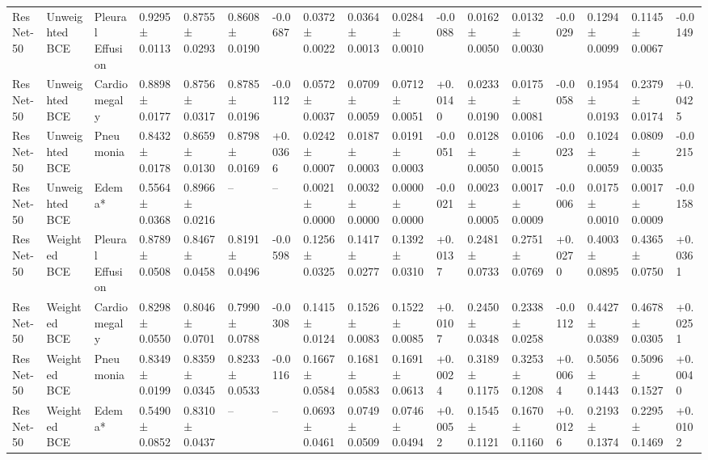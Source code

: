 \begin{tabular}{lllllllllllllllll}
ResNet-50 & Unweighted BCE & Pleural Effusion & 0.9295 ± 0.0113 & 0.8755 ± 0.0293 & 0.8608 ± 0.0190 & -0.0687 & 0.0372 ± 0.0022 & 0.0364 ± 0.0013 & 0.0284 ± 0.0010 & -0.0088 & 0.0162 ± 0.0050 & 0.0132 ± 0.0030 & -0.0029 & 0.1294 ± 0.0099 & 0.1145 ± 0.0067 & -0.0149 \\
ResNet-50 & Unweighted BCE & Cardiomegaly & 0.8898 ± 0.0177 & 0.8756 ± 0.0317 & 0.8785 ± 0.0196 & -0.0112 & 0.0572 ± 0.0037 & 0.0709 ± 0.0059 & 0.0712 ± 0.0051 & +0.0140 & 0.0233 ± 0.0190 & 0.0175 ± 0.0081 & -0.0058 & 0.1954 ± 0.0193 & 0.2379 ± 0.0174 & +0.0425 \\
ResNet-50 & Unweighted BCE & Pneumonia & 0.8432 ± 0.0178 & 0.8659 ± 0.0130 & 0.8798 ± 0.0169 & +0.0366 & 0.0242 ± 0.0007 & 0.0187 ± 0.0003 & 0.0191 ± 0.0003 & -0.0051 & 0.0128 ± 0.0050 & 0.0106 ± 0.0015 & -0.0023 & 0.1024 ± 0.0059 & 0.0809 ± 0.0035 & -0.0215 \\
ResNet-50 & Unweighted BCE & Edema* & 0.5564 ± 0.0368 & 0.8966 ± 0.0216 & -- & -- & 0.0021 ± 0.0000 & 0.0032 ± 0.0000 & 0.0000 ± 0.0000 & -0.0021 & 0.0023 ± 0.0005 & 0.0017 ± 0.0009 & -0.0006 & 0.0175 ± 0.0010 & 0.0017 ± 0.0009 & -0.0158 \\
ResNet-50 & Weighted BCE & Pleural Effusion & 0.8789 ± 0.0508 & 0.8467 ± 0.0458 & 0.8191 ± 0.0496 & -0.0598 & 0.1256 ± 0.0325 & 0.1417 ± 0.0277 & 0.1392 ± 0.0310 & +0.0137 & 0.2481 ± 0.0733 & 0.2751 ± 0.0769 & +0.0270 & 0.4003 ± 0.0895 & 0.4365 ± 0.0750 & +0.0361 \\
ResNet-50 & Weighted BCE & Cardiomegaly & 0.8298 ± 0.0550 & 0.8046 ± 0.0701 & 0.7990 ± 0.0788 & -0.0308 & 0.1415 ± 0.0124 & 0.1526 ± 0.0083 & 0.1522 ± 0.0085 & +0.0107 & 0.2450 ± 0.0348 & 0.2338 ± 0.0258 & -0.0112 & 0.4427 ± 0.0389 & 0.4678 ± 0.0305 & +0.0251 \\
ResNet-50 & Weighted BCE & Pneumonia & 0.8349 ± 0.0199 & 0.8359 ± 0.0345 & 0.8233 ± 0.0533 & -0.0116 & 0.1667 ± 0.0584 & 0.1681 ± 0.0583 & 0.1691 ± 0.0613 & +0.0024 & 0.3189 ± 0.1175 & 0.3253 ± 0.1208 & +0.0064 & 0.5056 ± 0.1443 & 0.5096 ± 0.1527 & +0.0040 \\
ResNet-50 & Weighted BCE & Edema* & 0.5490 ± 0.0852 & 0.8310 ± 0.0437 & -- & -- & 0.0693 ± 0.0461 & 0.0749 ± 0.0509 & 0.0746 ± 0.0494 & +0.0052 & 0.1545 ± 0.1121 & 0.1670 ± 0.1160 & +0.0126 & 0.2193 ± 0.1374 & 0.2295 ± 0.1469 & +0.0102 \\
\bottomrule
\end{tabular}
